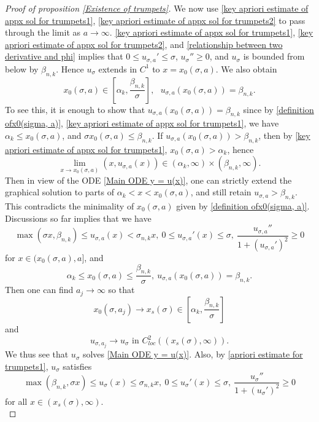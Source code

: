 \documentclass[pdflatex,sn-mathphys-num]{sn-jnl}
\begin{document}
\begin{proof}[Proof of proposition \ref{Existence of trumpets}]
   We now use \eqref{key apriori estimate of appx sol for trumpets1}, \eqref{key apriori estimate of appx sol for trumpets2} to pass through the limit as $a \to \infty$.
  \eqref{key apriori estimate of appx sol for trumpets1}, \eqref{key apriori estimate of appx sol for trumpets2}, and \eqref{relationship between two derivative and phi} implies that $ 0 \leq u_{\sigma, a}' \leq \sigma$, $u_{\sigma}'' \geq 0$, and $u_{\sigma}$ is bounded from below by $\beta_{n,k}$. Hence $u_{\sigma}$ extends in $C^1$ to $x = x_0(\sigma, a)$. We also obtain
\begin{equation}\label{estimate of x0(sigma, a)}
      x_0(\sigma, a) \in [\alpha_k, \frac{\beta_{n,k}}{\sigma}], \ \ \ u_{\sigma, a}(x_{0}(\sigma, a)) = \beta_{n,k}.
 \end{equation}
To see this, it is enough to show that $u_{\sigma, a}(x_0(\sigma, a)) = \beta_{n,k}$ since by \eqref{definition ofx0(sigma, a)}, \eqref{key apriori estimate of appx sol for trumpets1}, we have $\alpha_k \leq x_0(\sigma, a)$, and $\sigma x_0(\sigma, a) \leq \beta_{n,k}$. If $u_{\sigma, a}(x_0(\sigma, a)) > \beta_{n,k}$, then by \eqref{key apriori estimate of appx sol for trumpets1}, $x_0(\sigma, a) > \alpha_k$, hence
 \begin{equation}
     \lim_{x \to x_0(\sigma, a)}(x, u_{\sigma, a}(x)) \in (\alpha_k, \infty) \times (\beta_{n,k}, \infty).
 \end{equation}
    Then in view of the ODE \eqref{Main ODE y = u(x)}, one can strictly extend the graphical solution to parts of $\alpha_k < x < x_0(\sigma, a)$, and still retain $u_{\sigma, a} > \beta_{n,k}$. This contradicts the minimality of $x_0(\sigma, a)$ given by \eqref{definition ofx0(sigma, a)}. \\

  Discussions so far implies that we have
    \begin{equation}\label{apriori estimate for trumpets1}
        \max(\sigma x, \beta_{n,k}) \leq u_{\sigma, a}(x) <\sigma_{n,k}x, \ 0 \leq u_{\sigma, a}'(x) \leq \sigma, \  \frac{u_{\sigma, a}''}{1 + (u_{\sigma, a}')^2} \geq 0
    \end{equation}
    for $x \in (x_0(\sigma, a), a]$, and
    \begin{equation}
        \alpha_k \leq x_0(\sigma, a) \leq \frac{\beta_{n,k}}{\sigma}, \ u_{\sigma, a}(x_0(\sigma, a)) = \beta_{n,k}.
    \end{equation}
    Then one can find $a_j \to \infty$ so that
    $$x_0(\sigma, a_j) \to x_{s}(\sigma) \in [\alpha_k, \frac{\beta_{n,k}}{\sigma}]$$ and 
    $$u_{\sigma, a_j} \to u_{\sigma} \text{ in }C^2_{loc}((x_{s}(\sigma), \infty)).$$
    We thus see that $u_{\sigma}$ solves \eqref{Main ODE y = u(x)}. Also, by \eqref{apriori estimate for trumpets1}, $u_{\sigma}$ satisfies
   \begin{equation}\label{final apriori estimates for trumpets}
       \max(\beta_{n,k}, \sigma x) \leq u_{\sigma}(x) \leq \sigma_{n,k}x, \   0 \leq u_{\sigma}'(x) \leq \sigma, \  \frac{u_{\sigma}''}{1 + (u_{\sigma}')^2}\geq 0
   \end{equation}
   for all $x \in (x_{s}(\sigma), \infty)$. \\
   

\end{proof}
\end{document}
